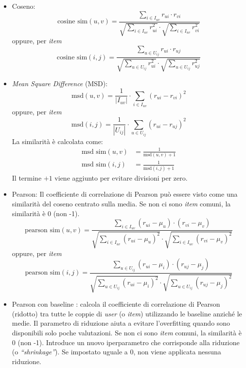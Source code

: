 \begin{itemize}
    \item Coseno:
        \[
        \text{cosine sim}(u, v) = \frac{\sum\limits_{i \in I_{uv}} r_{ui} \cdot r_{vi}}{\sqrt{\sum\limits_{i \in I_{uv}} r_{ui}^2} \cdot \sqrt{\sum\limits_{i \in I_{uv}} r_{vi}^2}}
        \]
        oppure, per \textit{item}
        \[
        \text{cosine sim}(i, j) = \frac{\sum\limits_{u \in U_{ij}} r_{ui} \cdot r_{uj}}{\sqrt{\sum\limits_{u \in U_{ij}} r_{ui}^2} \cdot \sqrt{\sum\limits_{u \in U_{ij}} r_{uj}^2}}
        \]
    \item \textit{Mean Square Difference} (MSD):
        \[
        \text{msd}(u, v) = \frac{1}{|I_{uv}|} \cdot \sum\limits_{i \in I_{uv}} (r_{ui} - r_{vi})^2
        \]
        oppure, per \textit{item}
        \[
        \text{msd}(i, j) = \frac{1}{|U_{ij}|} \cdot \sum\limits_{u \in U_{ij}} (r_{ui} - r_{uj})^2
        \]
        La similarità è calcolata come:
        \begin{align*}
            \text{msd sim}(u, v) &= \frac{1}{\text{msd}(u, v) + 1} \\
            \text{msd sim}(i, j) &= \frac{1}{\text{msd}(i, j) + 1}
        \end{align*}
        Il termine $+1$ viene aggiunto per evitare divisioni per zero.
    \item Pearson: Il coefficiente di correlazione di Pearson può essere visto come una similarità del coseno centrato sulla media. Se non ci sono \textit{item} comuni, la similarità è 0 (non -1).
        \[
        \text{pearson sim}(u, v) = \frac{\sum\limits_{i \in I_{uv}} (r_{ui} - \mu_u) \cdot (r_{vi} - \mu_v)}{\sqrt{\sum\limits_{i \in I_{uv}} (r_{ui} - \mu_u)^2} \cdot \sqrt{\sum\limits_{i \in I_{uv}} (r_{vi} - \mu_v)^2}}
        \]
        oppure, per \textit{item}
        \[
        \text{pearson sim}(i, j) = \frac{\sum\limits_{u \in U_{ij}} (r_{ui} - \mu_i) \cdot (r_{uj} - \mu_j)}{\sqrt{\sum\limits_{u \in U_{ij}} (r_{ui} - \mu_i)^2} \cdot \sqrt{\sum\limits_{u \in U_{ij}} (r_{uj} - \mu_j)^2}}
        \]
    \item Pearson con baseline \cite{Recommendation_book}: calcola il coefficiente di correlazione di Pearson (ridotto) tra tutte le coppie di \textit{user} (o \textit{item}) utilizzando le baseline anziché le medie. Il parametro di riduzione aiuta a evitare l'overfitting quando sono disponibili solo poche valutazioni. Se non ci sono \textit{item} comuni, la similarità è 0 (non -1). Introduce un nuovo iperparametro che corrisponde alla riduzione (o \textit{``shrinkage''}). Se impostato uguale a 0, non viene applicata nessuna riduzione.

\end{itemize}
